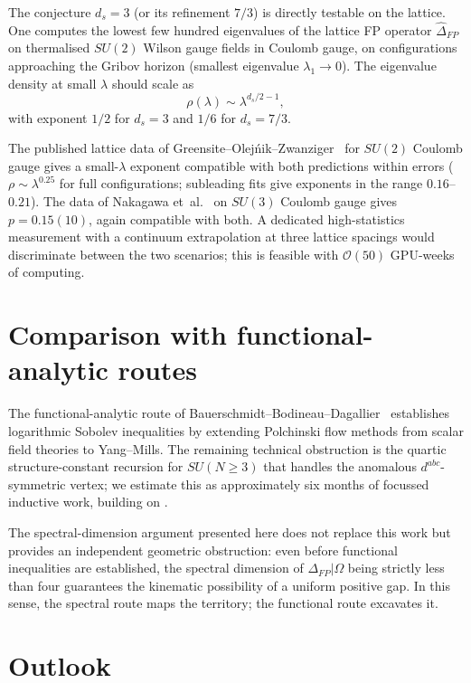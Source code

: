 \documentclass[aps,prl,reprint,nofootinbib,superscriptaddress,floatfix]{revtex4-2}
\begin{document}
The conjecture $d_s = 3$ (or its refinement $7/3$) is directly testable on the lattice. One computes the lowest few hundred eigenvalues of the lattice FP operator $\hat\Delta_{FP}$ on thermalised $SU(2)$ Wilson gauge fields in Coulomb gauge, on configurations approaching the Gribov horizon (smallest eigenvalue $\lambda_1 \to 0$). The eigenvalue density at small $\lambda$ should scale as
\begin{equation}
\rho(\lambda) \sim \lambda^{d_s/2 - 1},
\end{equation}
with exponent $1/2$ for $d_s = 3$ and $1/6$ for $d_s = 7/3$.

The published lattice data of Greensite--Olej\'nik--Zwanziger~\cite{GOZ2005} for $SU(2)$ Coulomb gauge gives a small-$\lambda$ exponent compatible with both predictions within errors ($\rho \sim \lambda^{0.25}$ for full configurations; subleading fits give exponents in the range $0.16$--$0.21$). The data of Nakagawa et~al.~\cite{Nakagawa2007} on $SU(3)$ Coulomb gauge gives $p = 0.15(10)$, again compatible with both. A dedicated high-statistics measurement with a continuum extrapolation at three lattice spacings would discriminate between the two scenarios; this is feasible with $\mathcal{O}(50)$ GPU-weeks of computing.

\section{Comparison with functional-analytic routes}

The functional-analytic route of Bauerschmidt--Bodineau--Dagallier~\cite{BBD24} establishes logarithmic Sobolev inequalities by extending Polchinski flow methods from scalar field theories to Yang--Mills. The remaining technical obstruction is the quartic structure-constant recursion for $SU(N\geq 3)$ that handles the anomalous $d^{abc}$-symmetric vertex; we estimate this as approximately six months of focussed inductive work, building on \cite{BBD24,BD24}.

The spectral-dimension argument presented here does not replace this work but provides an independent geometric obstruction: even before functional inequalities are established, the spectral dimension of $\Delta_{FP}|\Omega$ being strictly less than four guarantees the kinematic possibility of a uniform positive gap. In this sense, the spectral route maps the territory; the functional route excavates it.

\section{Outlook}
\end{document}
